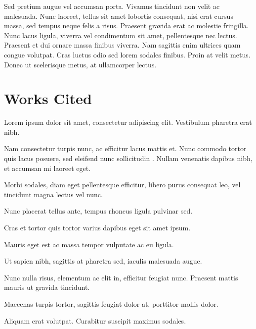\documentclass[a4paper]{memoir}
\begin{document}
Sed pretium augue vel accumsan porta. Vivamus tincidunt non velit ac malesuada. Nunc laoreet, tellus sit amet lobortis consequat, nisi erat cursus massa, sed tempus neque felis a risus. Praesent gravida erat ac molestie fringilla. Nunc lacus ligula, viverra vel condimentum sit amet, pellentesque nec lectus. Praesent et dui ornare massa finibus viverra. Nam sagittis enim ultrices quam congue volutpat. Cras luctus odio sed lorem sodales finibus. Proin at velit metus. Donec ut scelerisque metus, at ullamcorper lectus. 

\chapter*{Works Cited}
\label{workscited}

Lorem ipsum dolor sit amet, consectetur adipiscing elit. Vestibulum pharetra erat nibh.

Nam consectetur turpis nunc, ac efficitur lacus mattis et. Nunc commodo tortor quis lacus posuere, sed eleifend nunc sollicitudin
.
Nullam venenatis dapibus nibh, et accumsan mi laoreet eget. 

Morbi sodales, diam eget pellentesque efficitur, libero purus consequat leo, vel tincidunt magna lectus vel nunc. 

Nunc placerat tellus ante, tempus rhoncus ligula pulvinar sed. 

Cras et tortor quis tortor varius dapibus eget sit amet ipsum. 

Mauris eget est ac massa tempor vulputate ac eu ligula. 

Ut sapien nibh, sagittis at pharetra sed, iaculis malesuada augue. 

Nunc nulla risus, elementum ac elit in, efficitur feugiat nunc. Praesent mattis mauris ut gravida tincidunt. 

Maecenas turpis tortor, sagittis feugiat dolor at, porttitor mollis dolor. 

Aliquam erat volutpat. Curabitur suscipit maximus sodales.


\backmatter
\end{document}
